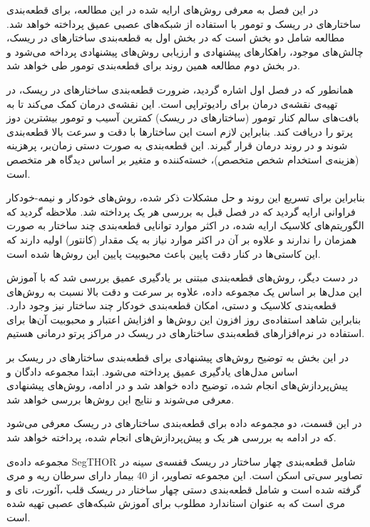 

در این فصل به معرفی روش‌های ارایه شده در این مطالعه، برای قطعه‌بندی ساختارهای در ریسک و تومور با استفاده از شبکه‌های عصبی عمیق پرداخته خواهد شد. مطالعه شامل دو بخش است که در بخش اول به قطعه‌بندی ساختارهای در ریسک، چالش‌های موجود، راهکارهای پیشنهادی و ارزیابی روش‌های پیشنهادی پرداخه می‌شود و در بخش دوم مطالعه همین روند برای قطعه‌بندی تومور طی خواهد شد.


همانطور که در فصل اول اشاره گردید، ضرورت قطعه‌بندی ساختارهای در ریسک، در تهیه‌ی نقشه‌ی درمان برای رادیوتراپی است. این نقشه‌ی درمان کمک می‌کند تا به بافت‌های سالم کنار تومور (ساختارهای در ریسک) کمترین آسیب و تومور بیشترین دوز پرتو را دریافت کند. بنابراین لازم است این ساختارها با دقت  و سرعت بالا قطعه‌بندی شوند و در روند درمان قرار گیرند. این قطعه‌بندی به صورت دستی زمان‌بر، پرهزینه (هزینه‌ی استخدام شخص متخصص)، خسته‌کننده و متغیر بر اساس دیدگاه هر متخصص است.

بنابراین برای تسریع این روند و حل مشکلات ذکر شده، روش‌های خودکار و نیمه‌-خودکار فراوانی ارایه گردید که در فصل قبل به بررسی هر یک پرداخته شد. ملاحظه گردید که الگوریتم‌های کلاسیک ارایه شده، در اکثر موارد توانایی قطعه‌بندی چند ساختار به صورت همزمان را ندارند و علاوه بر آن در اکثر موارد نیاز به یک مقدار (کانتور) اولیه دارند که این کاستی‌ها در کنار دقت پایین باعث محبوبیت پایین این روش‌ها شده است.

در دست دیگر، روش‌های قطعه‌بندی مبتنی بر یادگیری عمیق بررسی شد که با آموزش این مدل‌ها بر اساس یک مجموعه داده، علاوه بر سرعت و دقت بالا نسبت به روش‌های قطعه‌بندی کلاسیک و دستی، امکان قطعه‌بندی خودکار چند ساختار نیز وجود دارد. بنابراین شاهد استفاده‌ی روز افزون این روش‌ها و افزایش اعتبار و محبوبیت آن‌ها برای استفاده در نرم‌افزارهای قطعه‌بندی ساختارهای در ریسک در مراکز پرتو درمانی هستیم.

در این بخش به توضیح روش‌های پیشنهادی برای قطعه‌بندی ساختارهای در ریسک  بر اساس مدل‌های یادگیری عمیق پرداخته می‌شود. ابتدا مجموعه دادگان و پیش‌پردازش‌های انجام شده، توضیح داده خواهد شد و در ادامه، روش‌های پیشنهادی معرفی می‌شوند و نتایج این روش‌ها بررسی خواهد شد.

\label{segthor}
در این قسمت، دو مجموعه داده‌ برای قطعه‌بندی ساختارهای در ریسک معرفی می‌شود که در ادامه به بررسی هر یک و پیش‌پردازش‌های انجام شده، پرداخته خواهد شد.

مجموعه داده‌ی SegTHOR شامل قطعه‌بندی چهار ساختار در ریسک قفسه‌ی سینه در تصاویر سی‌تی اسکن است. این مجموعه تصاویر، از 40 بیمار دارای سرطان ریه و مری گرفته شده است و شامل قطعه‌بندی دستی چهار ساختار در ریسک قلب ،آئورت، نای و مری است که به عنوان استاندارد مطلوب برای آموزش شبکه‌های عصبی تهیه شده است.

